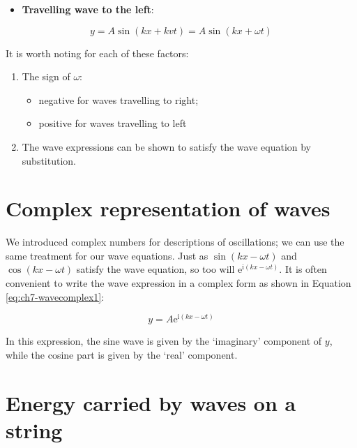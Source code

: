 \documentclass[
]{book}
\providecommand{\tightlist}{%
  \setlength{\itemsep}{0pt}\setlength{\parskip}{0pt}}
\begin{document}
\begin{itemize}
\tightlist
\item
  \textbf{Travelling wave to the left}:
\end{itemize}

\begin{equation}
y = A \sin \left( kx + kvt \right) = A \sin \left( kx + \omega t \right)
\label{eq:ch7-travellingtoleft1}
\end{equation}

It is worth noting for each of these factors:

\begin{enumerate}
\def\labelenumi{\arabic{enumi}.}
\tightlist
\item
  The sign of \(\omega\):

  \begin{itemize}
  \tightlist
  \item
    negative for waves travelling to right;
  \item
    positive for waves travelling to left
  \end{itemize}
\item
  The wave expressions can be shown to satisfy the wave equation by substitution.
\end{enumerate}

\hypertarget{sec:ch7-complexrep}{%
\section{Complex representation of waves}\label{sec:ch7-complexrep}}

We introduced complex numbers for descriptions of oscillations; we can use the same treatment for our wave equations. Just as \(\sin(kx - \omega t)\) and \(\cos(kx-\omega t)\) satisfy the wave equation, so too will \(\mathrm{e}^{\mathrm{i}(kx-\omega t)}\). It is often convenient to write the wave expression in a complex form as shown in Equation \eqref{eq:ch7-wavecomplex1}:

\begin{equation}
y = A \mathrm{e}^{\mathrm{i}(kx-\omega t)}
\label{eq:ch7-wavecomplex1}
\end{equation}

In this expression, the sine wave is given by the `imaginary' component of \(y\), while the cosine part is given by the `real' component.

\hypertarget{sec:ch7-energywavesstring}{%
\section{Energy carried by waves on a string}\label{sec:ch7-energywavesstring}}
\end{document}
